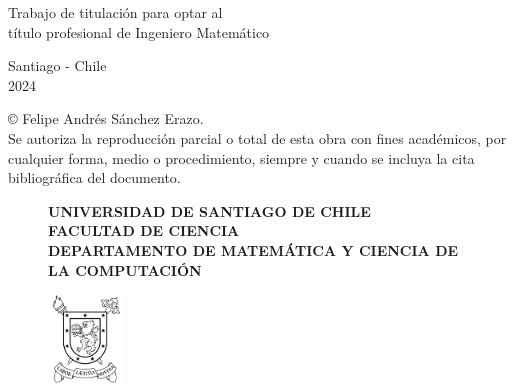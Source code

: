 \begin{titlepage}
\begin{center}
\vspace{2cm}

\hspace{0.45\linewidth}
\begin{minipage}[b]{0.45\linewidth}
\begin{flushleft}
Trabajo de titulación para optar
al \\
título profesional de Ingeniero Matemático
\end{flushleft}
\end{minipage}

\vspace{1.5cm}

\begin{center}
Santiago - Chile \\
2024
\end{center}

\end{center}
\end{titlepage}
  © Felipe Andrés Sánchez Erazo. \\
Se  autoriza  la  reproducción  parcial  o  total  de  esta  obra  con  fines 
académicos,  por  cualquier  forma,  medio  o  procedimiento,  siempre  y 
cuando se incluya la cita bibliográfica del documento. 

\newpage


%
%

\begin{figure}[ht]
\hspace{0.1\linewidth}
\begin{minipage}[b]{0.75\linewidth}
\begin{center}
\textbf{\Large{UNIVERSIDAD DE SANTIAGO DE CHILE}}\\
\textbf{FACULTAD DE CIENCIA}\\
\textbf{DEPARTAMENTO DE MATEMÁTICA Y CIENCIA DE LA COMPUTACIÓN}
\end{center}	
\end{minipage}
\begin{minipage}[b]{0.1\linewidth}
\centering
\includegraphics[width=2cm]{Imágenes/logo5}
\end{minipage}
\end{figure}

